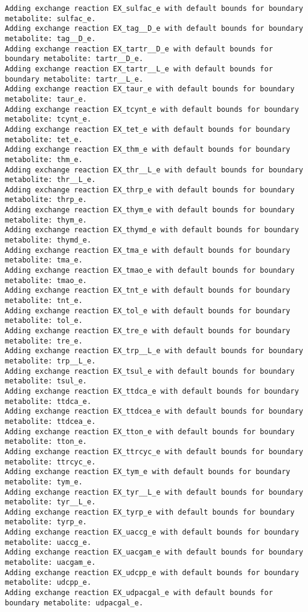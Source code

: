 \documentclass[
  letterpaper,
  DIV=11,
  numbers=noendperiod]{scrartcl}
\begin{document}
\begin{verbatim}
Adding exchange reaction EX_sulfac_e with default bounds for boundary metabolite: sulfac_e.
Adding exchange reaction EX_tag__D_e with default bounds for boundary metabolite: tag__D_e.
Adding exchange reaction EX_tartr__D_e with default bounds for boundary metabolite: tartr__D_e.
Adding exchange reaction EX_tartr__L_e with default bounds for boundary metabolite: tartr__L_e.
Adding exchange reaction EX_taur_e with default bounds for boundary metabolite: taur_e.
Adding exchange reaction EX_tcynt_e with default bounds for boundary metabolite: tcynt_e.
Adding exchange reaction EX_tet_e with default bounds for boundary metabolite: tet_e.
Adding exchange reaction EX_thm_e with default bounds for boundary metabolite: thm_e.
Adding exchange reaction EX_thr__L_e with default bounds for boundary metabolite: thr__L_e.
Adding exchange reaction EX_thrp_e with default bounds for boundary metabolite: thrp_e.
Adding exchange reaction EX_thym_e with default bounds for boundary metabolite: thym_e.
Adding exchange reaction EX_thymd_e with default bounds for boundary metabolite: thymd_e.
Adding exchange reaction EX_tma_e with default bounds for boundary metabolite: tma_e.
Adding exchange reaction EX_tmao_e with default bounds for boundary metabolite: tmao_e.
Adding exchange reaction EX_tnt_e with default bounds for boundary metabolite: tnt_e.
Adding exchange reaction EX_tol_e with default bounds for boundary metabolite: tol_e.
Adding exchange reaction EX_tre_e with default bounds for boundary metabolite: tre_e.
Adding exchange reaction EX_trp__L_e with default bounds for boundary metabolite: trp__L_e.
Adding exchange reaction EX_tsul_e with default bounds for boundary metabolite: tsul_e.
Adding exchange reaction EX_ttdca_e with default bounds for boundary metabolite: ttdca_e.
Adding exchange reaction EX_ttdcea_e with default bounds for boundary metabolite: ttdcea_e.
Adding exchange reaction EX_tton_e with default bounds for boundary metabolite: tton_e.
Adding exchange reaction EX_ttrcyc_e with default bounds for boundary metabolite: ttrcyc_e.
Adding exchange reaction EX_tym_e with default bounds for boundary metabolite: tym_e.
Adding exchange reaction EX_tyr__L_e with default bounds for boundary metabolite: tyr__L_e.
Adding exchange reaction EX_tyrp_e with default bounds for boundary metabolite: tyrp_e.
Adding exchange reaction EX_uaccg_e with default bounds for boundary metabolite: uaccg_e.
Adding exchange reaction EX_uacgam_e with default bounds for boundary metabolite: uacgam_e.
Adding exchange reaction EX_udcpp_e with default bounds for boundary metabolite: udcpp_e.
Adding exchange reaction EX_udpacgal_e with default bounds for boundary metabolite: udpacgal_e.

\end{verbatim}
\end{document}
